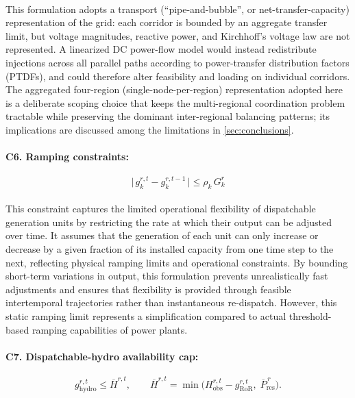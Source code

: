 \documentclass[12pt]{article}
\begin{document}
\paragraph{}
This formulation adopts a transport (``pipe-and-bubble'', or net-transfer-capacity) representation of the grid: each corridor is bounded by an aggregate transfer limit, but voltage magnitudes, reactive power, and Kirchhoff's voltage law are not represented. A linearized DC power-flow model would instead redistribute injections across all parallel paths according to power-transfer distribution factors (PTDFs), and could therefore alter feasibility and loading on individual corridors. The aggregated four-region (single-node-per-region) representation adopted here is a deliberate scoping choice that keeps the multi-regional coordination problem tractable while preserving the dominant inter-regional balancing patterns; its implications are discussed among the limitations in \cref{sec:conclusions}.


\paragraph{C6. Ramping constraints:}
\begin{equation}
\bigl|\, g^{r,t}_k - g^{r,t-1}_k \,\bigr| \le \rho_k\, G^{r}_k
\end{equation}
\paragraph{}
This constraint captures the limited operational flexibility of dispatchable generation units by restricting the rate at which their output can be adjusted over time. It assumes that the generation of each unit can only increase or decrease by a given fraction of its installed capacity from one time step to the next, reflecting physical ramping limits and operational constraints. By bounding short-term variations in output, this formulation prevents unrealistically fast adjustments and ensures that flexibility is provided through feasible intertemporal trajectories rather than instantaneous re-dispatch. However, this static ramping limit represents a simplification compared to actual threshold-based ramping capabilities of power plants.

\paragraph{C7. Dispatchable-hydro availability cap:}
\begin{equation}\label{eq:C7}
g^{r,t}_{\text{hydro}} \le \overline{H}^{r,t},
\qquad
\overline{H}^{r,t} = \min\!\Big( H^{r,t}_{\text{obs}} - g^{r,t}_{\text{RoR}},\; \overline{P}^{\,r}_{\text{res}} \Big).
\end{equation}
\end{document}
